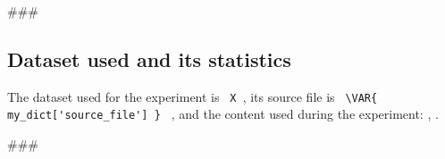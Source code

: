 
\usepackage{comment}

###

\hfill\break
\subsection{Dataset used and its statistics}
The dataset used for the experiment is  \lstinline[style=verbatim-text]| X |,
its source file is \lstinline[style=verbatim-text]| \VAR{ my_dict['source_file'] } | ,
and the content used during the experiment:
     ,
.

###


\begin{comment}
Author = DIEGO MICCOLI
Alias = Kozen88
Organization = SWAP Research Group UniBa
Date = 27-12-2023

This mini template is not working by itself because there are latex command missing needed
to compile the file and give as output a pdf file, in addition it has been added jinja
statement in order to control the rendering of the latex file with the jinja library, for these
reasons it needs to be used with the other mini chunks in conjunction.
\end{comment}
